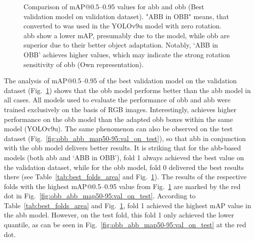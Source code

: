 \begin{figure}[htbp]
    \centering
    
    \caption[Comparison of \acrshort{mAP}@0.5--0.95 values for \acrshort{abb} and \acrshort{obb} (Best validation model on validation dataset)]{Comparison of \acrshort{mAP}@0.5--0.95 values for \acrshort{abb} and \acrshort{obb} (Best validation model on validation dataset). "ABB in OBB" means, that  converted to  was used in the \acrshort{YOLO}v9u model with zero rotation. \acrshort{abb} show a lower \acrshort{mAP}, presumably due to the model, while \acrshort{obb} are superior due to their better object adaptation. Notably, ‘ABB in OBB’ achieves higher values, which may indicate the strong rotation sensitivity of \acrshort{obb} (Own representation).}
    \label{fig:obb_abb_map50-95:val_on_val}
\end{figure}
The analysis of \acrshort{mAP}@0.5--0.95 of the best validation model on the validation dataset (Fig.~\ref{fig:obb_abb_map50-95:val_on_val}) shows that the \acrshort{obb} model performs better than the \acrshort{abb} model in all cases. All models used to evaluate the performance of \acrshort{obb} and \acrshort{abb} were trained exclusively on the basis of \acrshort{RGB} images. Interestingly,  achieves higher performance on the \acrshort{obb} model than the adapted \acrshort{obb} boxes within the same model (\acrshort{YOLO}v9u). The same phenomenon can also be observed on the test dataset (Fig.~\ref{fig:obb_abb_map50-95:val_on_test}), so that \acrshort{abb} in conjunction with the \acrshort{obb} model delivers better results. It is striking that for the \acrshort{abb}-based models (both \acrshort{abb} and ‘ABB in OBB’), fold 1 always achieved the best value on the validation dataset, while for the \acrshort{obb} model, fold 0 delivered the best results there (see Table~\ref{tab:best_folds_area} and Fig.~\ref{fig:obb_abb_map50-95:val_on_val}). The results of the respective folds with the highest \acrshort{mAP}@0.5--0.95 value from Fig.~\ref{fig:obb_abb_map50-95:val_on_val} are marked by the red dot in Fig.~\ref{fig:obb_abb_map50-95:val_on_test}. According to Table~\ref{tab:best_folds_area} and Fig.~\ref{fig:obb_abb_map50-95:val_on_val}, fold 1 achieved the highest \acrshort{mAP} value in the \acrshort{abb} model. However, on the test fold, this fold 1 only achieved the lower quantile, as can be seen in Fig.~\ref{fig:obb_abb_map50-95:val_on_test} at the red dot.



